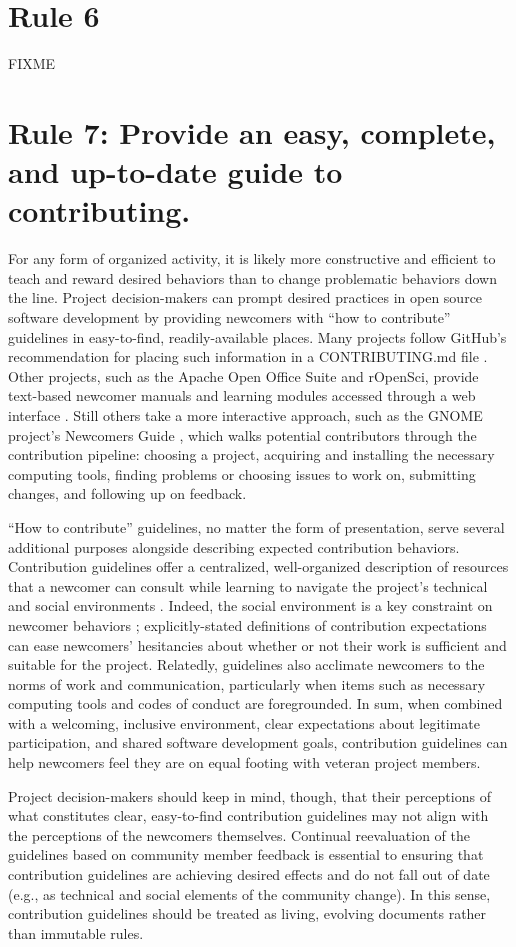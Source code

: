 \documentclass[10pt,letterpaper]{article}
\newcommand{\rulemajor}[1]{\section{#1}}
\begin{document}
\rulemajor{Rule 6}

FIXME

\rulemajor{Rule 7: Provide an easy, complete, and up-to-date guide to contributing.}

For any form of organized activity,
it is likely more constructive and efficient to teach and reward desired behaviors
than to change problematic behaviors down the line.
Project decision-makers can prompt desired practices in open source software development
by providing newcomers with ``how to contribute'' guidelines in easy-to-find, readily-available places.
Many projects follow GitHub's recommendation for placing such information in a CONTRIBUTING.md file \cite{github-rec}.
Other projects,
such as the Apache Open Office Suite and rOpenSci,
provide text-based newcomer manuals and learning modules accessed through a web interface \cite{apache-guidelines,ropensci-guidelines}.
Still others take a more interactive approach,
such as the GNOME project's Newcomers Guide \cite{gnome-newcomers},
which walks potential contributors through the contribution pipeline:
choosing a project,
acquiring and installing the necessary computing tools,
finding problems or choosing issues to work on,
submitting changes,
and following up on feedback.

``How to contribute'' guidelines,
no matter the form of presentation,
serve several additional purposes alongside describing expected contribution behaviors.
Contribution guidelines offer a centralized, well-organized description of resources
that a newcomer can consult while learning to navigate the project's technical and social environments \cite{zanatta2017}.
Indeed, the social environment is a key constraint on newcomer behaviors \cite{steinmacher2015};
explicitly-stated definitions of contribution expectations can ease newcomers' hesitancies
about whether or not their work is sufficient and suitable for the project.
Relatedly,
guidelines also acclimate newcomers to the norms of work and communication,
particularly when items such as necessary computing tools and codes of conduct are foregrounded.
In sum,
when combined with a welcoming, inclusive environment,
clear expectations about legitimate participation,
and shared software development goals,
contribution guidelines can help newcomers feel they are on equal footing with veteran project members.

Project decision-makers should keep in mind,
though,
that their perceptions of what constitutes clear, easy-to-find contribution guidelines
may not align with the perceptions of the newcomers themselves.
Continual reevaluation of the guidelines based on community member feedback is essential
to ensuring that contribution guidelines are achieving desired effects
and do not fall out of date (e.g., as technical and social elements of the community change).
In this sense,
contribution guidelines should be treated as living, evolving documents rather than immutable rules.
\end{document}
